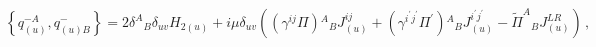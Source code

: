 \begin{equation}\label{sualg}
\left\{q^{-A}_{(u)},q^-_{(u)B}\right\}=2\delta^A{}_B\delta_{uv}H_{2(u)} + i\mu\delta_{uv}\left((\gamma^{ij}\Pi){}^A{}_B J^{ij}_{(u)}+(\gamma^{i^\prime j^\prime 
}\Pi^\prime){}^A{}_B  J^{i^\prime j^\prime}_{(u)} -{\tilde\Pi}^A{}_BJ^{LR}_{(u)}
\right)\,,
\end{equation}

